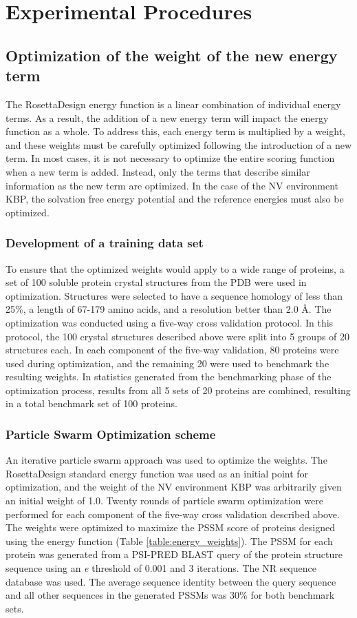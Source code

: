 \section{Experimental Procedures}

\subsection{Optimization of the weight of the new energy term}
The RosettaDesign energy function is a linear combination of individual energy terms.
As a result, the addition of a new energy term will impact the energy function as a whole.
To address this, each energy term is multiplied by a weight, and these weights must be carefully optimized following the introduction of a new term.
In most cases, it is not necessary to optimize the entire scoring function when a new term is added.
Instead, only the terms that describe similar information as the new term are optimized.
In the case of the \ac{NV} environment \ac{KBP}, the solvation free energy potential and the reference energies must also be optimized. 

\subsubsection{Development of a training data set}
To ensure that the optimized weights would apply to a wide range of proteins, a set of 100 soluble protein crystal structures from the \ac{PDB} were used in optimization.
Structures were selected to have a sequence homology of less than 25\%, a length of 67-179 amino acids, and a resolution better than 2.0 \AA.
The optimization was conducted using a five-way cross validation protocol.
In this protocol, the 100 crystal structures described above were split into 5 groups of 20 structures each.
In each component of the five-way validation, 80 proteins were used during optimization, and the remaining 20 were used to benchmark the resulting weights.
In statistics generated from the benchmarking phase of the optimization process, results from all 5 sets of 20 proteins are combined, resulting in a total benchmark set of 100 proteins. 

\subsubsection{Particle Swarm Optimization scheme}
An iterative particle swarm approach \citep{Chen:2007ua} was used to optimize the weights.
The RosettaDesign standard energy function was used as an initial point for optimization, and the weight of the \ac{NV} environment \ac{KBP} was arbitrarily given an initial weight of 1.0.
Twenty rounds of particle swarm optimization were performed for each component of the five-way cross validation described above.
The weights were optimized to maximize the \ac{PSSM} score of proteins designed using the energy function (Table \ref{table:energy_weights}).
The \ac{PSSM} for each protein was generated from a PSI-PRED \ac{BLAST} query of the protein structure sequence using an \textit{e} threshold of 0.001 and 3 iterations.
The \ac{NR} sequence database was used.
The average sequence identity between the query sequence and all other sequences in the generated \ac{PSSM}s was 30\% for both benchmark sets.

